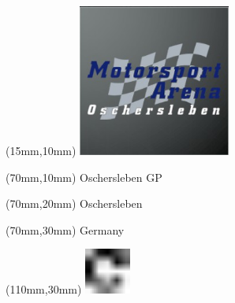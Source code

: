 \null\newpage
\begin{textblock*}{50mm}(15mm,10mm)%
\includegraphics[width=50mm]{LG/2015-05-20_00090.png}
\end{textblock*}
\begin{textblock*}{130mm}(70mm,10mm)%
{\fontsize{20}{20}\selectfont Oschersleben GP}\\
\end{textblock*}
\begin{textblock*}{120mm}(70mm,20mm)%
{\fontsize{16}{16}\selectfont Oschersleben}\\
\end{textblock*}
\begin{textblock*}{120mm}(70mm,30mm)%
{\fontsize{12}{12}\selectfont Germany}
\end{textblock*}
\begin{textblock*}{30mm}(110mm,30mm)%
\centering
\includegraphics[height=15mm]{icons/fa-rotate-right.pdf}
\end{textblock*}
